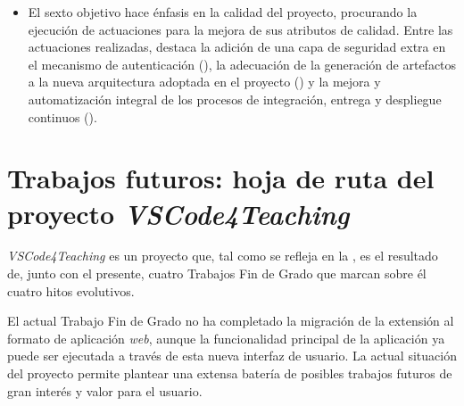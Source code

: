 \begin{itemize}
    \item El sexto objetivo hace énfasis en la calidad del proyecto, procurando la ejecución de actuaciones para la mejora de sus atributos de calidad. Entre las actuaciones realizadas, destaca la adición de una capa de seguridad extra en el mecanismo de autenticación (), la adecuación de la generación de artefactos a la nueva arquitectura adoptada en el proyecto () y la mejora y automatización integral de los procesos de integración, entrega y despliegue continuos ().
\end{itemize}

\section{Trabajos futuros: hoja de ruta del proyecto \textit{VSCode4Teaching}}
\label{subsec:trabajosFuturos}
\textit{VSCode4Teaching} es un proyecto que, tal como se refleja en la , es el resultado de, junto con el presente, cuatro Trabajos Fin de Grado que marcan sobre él cuatro hitos evolutivos.

El actual Trabajo Fin de Grado no ha completado la migración de la extensión al formato de aplicación \textit{web}, aunque la funcionalidad principal de la aplicación ya puede ser ejecutada a través de esta nueva interfaz de usuario. La actual situación del proyecto permite plantear una extensa batería de posibles trabajos futuros de gran interés y valor para el usuario.

